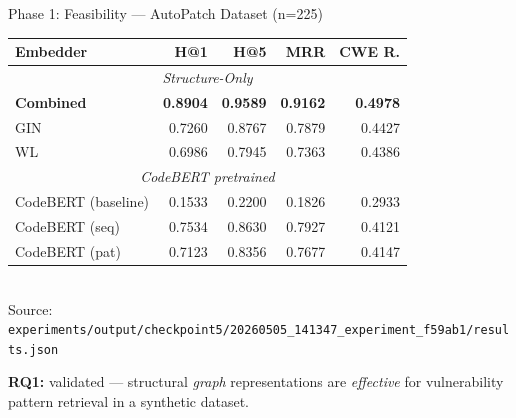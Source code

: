 \documentclass[aspectratio=169,10pt]{beamer}
\begin{document}
\begin{frame}{Phase 1: Feasibility — AutoPatch Dataset (n=225)}

  \vspace{0.3cm}
  \begin{table}
    \centering
    \small
    \begin{tabular}{lrrrr}
      \toprule
      \textbf{Embedder} & \textbf{H@1} & \textbf{H@5} & \textbf{MRR} & \textbf{CWE R.} \\
      \midrule
      \multicolumn{5}{c}{\textit{Structure-Only}} \\
      \midrule
      \textbf{Combined} & \textbf{0.8904} & \textbf{0.9589} & \textbf{0.9162} & \textbf{0.4978} \\
      GIN & 0.7260 & 0.8767 & 0.7879 & 0.4427 \\
      WL & 0.6986 & 0.7945 & 0.7363 & 0.4386 \\
      \midrule
      \multicolumn{5}{c}{\textit{CodeBERT pretrained}} \\
      \midrule
      CodeBERT (baseline) & 0.1533 & 0.2200 & 0.1826 & 0.2933 \\
      CodeBERT (seq) & 0.7534 & 0.8630 & 0.7927 & 0.4121 \\
CodeBERT (pat) & 0.7123 & 0.8356 & 0.7677 & 0.4147 \\      \bottomrule
    \end{tabular}
    \\[2pt]
    {\tiny\textcolor{notecol}{Source: \texttt{experiments/output/checkpoint5/20260505\_141347\_experiment\_f59ab1/results.json}}}
  \end{table}

  
  \textbf{RQ1:} validated — structural \textit{graph} representations are \textit{effective} for vulnerability pattern retrieval in a synthetic dataset.
\end{frame}
\end{document}
